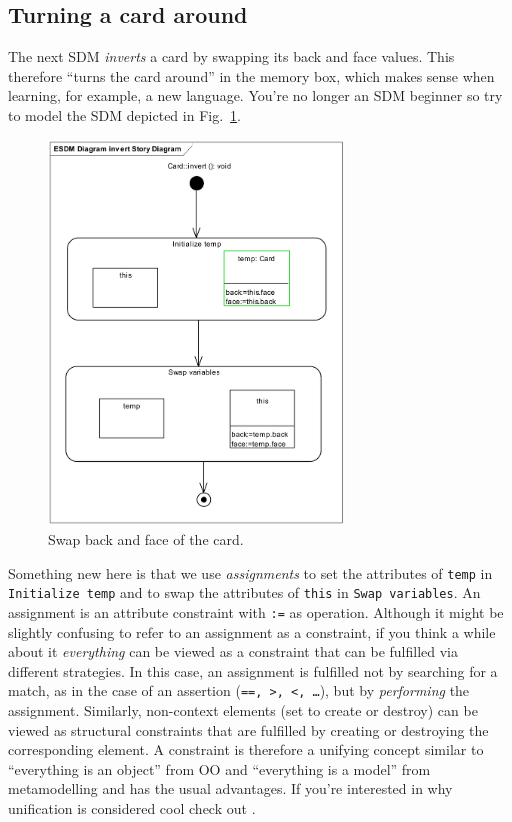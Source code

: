 \subsection{Turning a card around} 

The next SDM \emph{inverts} a card by swapping its back and face values.  This
therefore ``turns the card around'' in the memory box, which makes sense when
learning, for example, a new language.  You're no longer an SDM beginner so try
to model the SDM depicted in Fig.~\ref{fig:sdm_invert}.

\begin{figure}[htp]
\begin{center}
  \includegraphics[width=0.7\textwidth]{pics/sdmBilder/invert/sdm54}
  \caption{Swap back and face of the card.}  
  \label{fig:sdm_invert}
\end{center}
\end{figure}

Something new here is that we use \emph{assignments} to set the attributes of
\texttt{temp} in \texttt{Initialize temp} and to swap the attributes of
\texttt{this} in \texttt{Swap variables}.  An assignment is an attribute
constraint with \texttt{:=} as operation.  Although it might be slightly
confusing to refer to an assignment as a constraint, if you think a while about
it \emph{everything} can be viewed as a constraint that can be fulfilled via
different strategies.  In this case, an assignment is fulfilled not by searching
for a match, as in the case of an assertion (\texttt{==, >, <, \ldots}), but by
\emph{performing} the assignment.  Similarly, non-context elements (set to
create or destroy) can be viewed as structural constraints that are fulfilled by
creating or destroying the corresponding element.  A constraint is therefore
a unifying concept similar to ``everything is an object'' from OO and
``everything is a model'' from metamodelling and has the usual advantages.  If
you're interested in why unification is considered cool check out \cite{BEZ05}.

